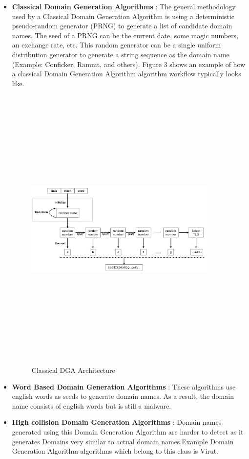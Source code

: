 \documentclass[conference]{IEEEtran}
\begin{document}
\begin{itemize}
\item \textbf{Classical Domain Generation Algorithms} : The general methodology used by a Classical Domain Generation Algorithm is using a deterministic pseudo-random generator (PRNG) to generate a list of candidate domain names. The seed of a PRNG can be the current date, some magic numbers, an exchange rate, etc. This random generator can be a single uniform distribution generator to generate a string sequence as the domain name (Example: Conficker, Ramnit, and others). 
Figure 3 shows an example of how a classical Domain Generation Algorithm algorithm workflow typically looks like.
\begin{figure}[!h]
\centerline{\includegraphics[width=9.5cm,height=14.5cm,keepaspectratio]{classic-DGA.png}}
\caption{Classical DGA Architecture }
\label{fig}

\end{figure}

\item \textbf{Word Based Domain Generation Algorithms} : These algorithms use english words as seeds to generate domain names. As a result, the domain name consists of english words but is still a malware.
\item \textbf{High collision Domain Generation Algorithms} : Domain names generated using this Domain Generation Algorithm are harder to detect as it generates Domains very similar to actual domain names.Example Domain Generation Algorithm algorithms which belong to this class is Virut.
\end{itemize}
\end{document}
